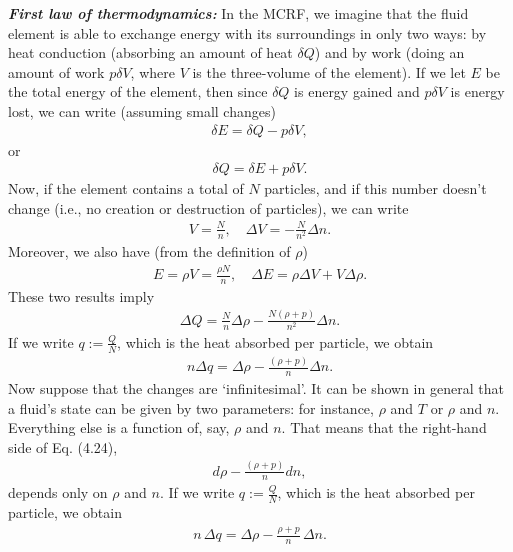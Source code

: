 \documentclass[11pt,letterpaper]{book}
\begin{document}
    \textit{\textbf{First law of thermodynamics:}}
    In the MCRF, we imagine that the fluid element is able to exchange energy with its surroundings in only two ways: by heat conduction (absorbing an amount of heat \(\delta Q\)) and by work (doing an amount of work \(p \delta V\), where \(V\) is the three-volume of the element). If we let \(E\) be the total energy of the element, then since \(\delta Q\) is energy gained and \(p \delta V\) is energy lost, we can write (assuming small changes)
    \begin{align}
    \delta E = \delta Q - p \delta V,
    \end{align}
    or
    \begin{align}
    \delta Q = \delta E + p \delta V.
    \tag{4.22}
    \end{align}
    Now, if the element contains a total of \(N\) particles, and if this number doesn’t change (i.e., no creation or destruction of particles), we can write
    \begin{align}
    V = \frac{N}{n}, \quad \Delta V = -\frac{N}{n^2} \Delta n. \tag{4.23}
    \end{align}
    Moreover, we also have (from the definition of \(\rho\))
    \begin{align}
    E = \rho V = \frac{\rho N}{n}, \quad \Delta E = \rho \Delta V + V \Delta \rho.
    \end{align}
    These two results imply
    \begin{align}
    \Delta Q = \frac{N}{n} \Delta \rho - \frac{N(\rho + p)}{n^2} \Delta n.
    \end{align}
    If we write \(q := \frac{Q}{N}\), which is the heat absorbed per particle, we obtain
    \begin{align}
    n \Delta q = \Delta \rho - \frac{(\rho + p)}{n} \Delta n. \tag{4.24}
    \end{align}
    Now suppose that the changes are ‘infinitesimal’. It can be shown in general that a fluid’s state can be given by two parameters: for instance, \(\rho\) and \(T\) or \(\rho\) and \(n\). Everything else is a function of, say, \(\rho\) and \(n\). That means that the right-hand side of Eq. (4.24),
    \begin{align}
    d\rho - \frac{(\rho + p)}{n} dn,
    \end{align}
    depends only on \(\rho\) and \(n\). If we write \( q := \frac{Q}{N} \), which is the heat absorbed per particle, we obtain
    \begin{align}
    n \, \Delta q = \Delta \rho - \frac{\rho + p}{n} \, \Delta n. \tag{4.24}
    \end{align}
\end{document}
